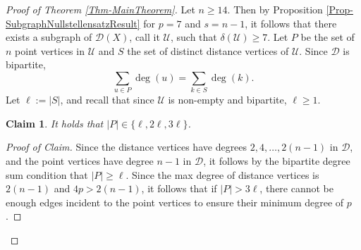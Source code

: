 \documentclass[12pt]{article}
\newtheorem*{claim}{Claim}
\theoremstyle{definition}
\begin{document}
	\begin{proof}[Proof of Theorem \ref{Thm-MainTheorem}]
		Let $n \geq 14$.  Then by Proposition \ref{Prop-SubgraphNullstellensatzResult} for $p = 7$ and $s = n-1$, it follows that there exists a subgraph of $\mathcal{D}(X)$, call it $\mathcal{U}$, such that $\delta(\mathcal{U}) \geq 7$.  Let $P$ be the set of $n$ point vertices in $\mathcal{U}$ and $S$ the set of distinct distance vertices of $\mathcal{U}$.  Since $\mathcal{D}$ is bipartite, 
		$$\sum_{u \in P}\deg(u) = \sum_{k \in S}\deg(k).$$
		Let $\ell := |S|$, and recall that since $\mathcal{U}$ is non-empty and bipartite, $\ell \geq 1$.  
		\begin{claim}
			It holds that $|P| \in \{\ell, 2\ell, 3\ell\}$.
		\end{claim}
		\begin{proof}[Proof of Claim]
			
			Since the distance vertices have degrees $2, 4, \ldots, 2(n-1)$ in $\mathcal{D}$, and the point vertices have degree $n-1$ in $\mathcal{D}$, it follows by the bipartite degree sum condition that $|P| \geq \ell$.  
			Since the max degree of distance vertices is $2(n-1)$ and $4p > 2(n-1)$, it follows that if $|P| > 3\ell$, there cannot be enough edges incident to the point vertices to ensure their minimum degree of $p$.  
			

\end{proof}
\end{proof}
\end{document}
